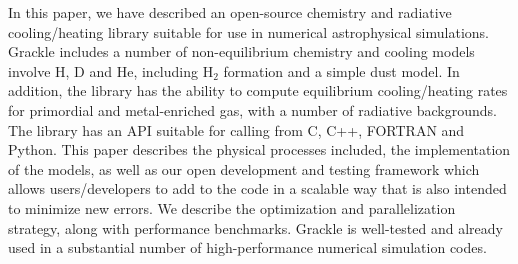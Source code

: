 In this paper, we have described an open-source chemistry and
radiative cooling/heating library suitable for use in numerical
astrophysical simulations.  Grackle includes a number of
non-equilibrium chemistry and cooling models involve H, D and He,
including H$_2$ formation and a simple dust model.  In addition, the
library has the ability to compute equilibrium cooling/heating rates
for primordial and metal-enriched gas, with a number of radiative
backgrounds.  The library has an API suitable for calling from C, C++,
FORTRAN and Python.  This paper describes the physical processes
included, the implementation of the models, as well as our open
development and testing framework which allows users/developers to add
to the code in a scalable way that is also intended to minimize new
errors.  We describe the optimization and parallelization strategy,
along with performance benchmarks.  Grackle is well-tested and already
used in a substantial number of high-performance numerical simulation
codes.



